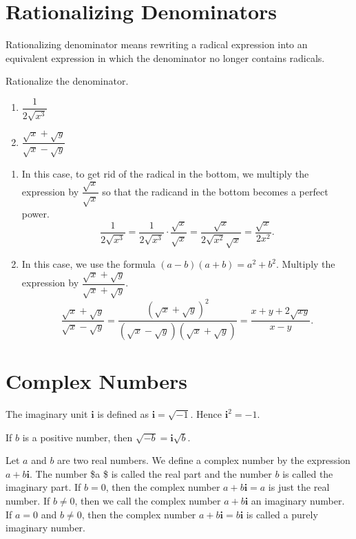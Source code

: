 \documentclass[en,12pt]{elegantbook}
\providecommand{\tightlist}{%
  \setlength{\itemsep}{0pt}\setlength{\parskip}{0pt}}
\newcommand{\ii}{\mathbf{i}}
\providecommand{\tightlist}{%
  \setlength{\itemsep}{0pt}\setlength{\parskip}{0pt}}
\let\BeginKnitrBlock\begin \let\EndKnitrBlock\end
\begin{document}
\hypertarget{rationalizing-denominators}{%
\section{Rationalizing Denominators}\label{rationalizing-denominators}}

Rationalizing denominator means rewriting a radical expression into an equivalent expression in which the denominator no longer contains radicals.

\BeginKnitrBlock{example}
\protect\hypertarget{exm:unnamed-chunk-79}{}{\label{exm:unnamed-chunk-79} }
Rationalize the denominator.

\begin{enumerate}
\def\labelenumi{\arabic{enumi}.}
\tightlist
\item
  \(\dfrac{1}{2\sqrt{x^3}}\)
\item
  \(\dfrac{\sqrt{x}+\sqrt{y}}{\sqrt{x}-\sqrt{y}}\)
\end{enumerate}
\EndKnitrBlock{example}

\BeginKnitrBlock{solution}


\begin{enumerate}
\def\labelenumi{\arabic{enumi}.}
\tightlist
\item
  In this case, to get rid of the radical in the bottom, we multiply the expression by \(\dfrac{\sqrt{x}}{\sqrt{x}}\) so that the radicand in the bottom becomes a perfect power.
  \[
   \dfrac{1}{2\sqrt{x^3}}=\dfrac{1}{2\sqrt{x^3}}\cdot\dfrac{\sqrt{x}}{\sqrt{x}}=\dfrac{\sqrt{x}}{2\sqrt{x^2}\sqrt{x}}=\dfrac{\sqrt{x}}{2x^2}.  
   \]
\item
  In this case, we use the formula \((a-b)(a+b)=a^2+b^2\). Multiply the expression by \(\dfrac{\sqrt{x}+\sqrt{y}}{\sqrt{x}+\sqrt{y}}\).
  \[
   \dfrac{\sqrt{x}+\sqrt{y}}{\sqrt{x}-\sqrt{y}}=\dfrac{(\sqrt{x}+\sqrt{y})^2}{(\sqrt{x}-\sqrt{y})(\sqrt{x}+\sqrt{y})}=\dfrac{x+y+2\sqrt{xy}}{x-y}.
   \]
\end{enumerate}
\EndKnitrBlock{solution}

\hypertarget{complex-numbers}{%
\section{Complex Numbers}\label{complex-numbers}}

The imaginary unit \(\ii\) is defined as \(\ii=\sqrt{-1}\). Hence \(\ii^2=-1\).

If \(b\) is a positive number, then \(\sqrt{-b}=\ii\sqrt{b}\).

Let \(a\) and \(b\) are two real numbers. We define a complex number by the expression \(a+b \ii\).
The number \$a \$ is called the real part and the number \(b\) is called the imaginary part. If \(b=0\),
then the complex number \(a+b\ii=a\) is just the real number.
If \(b\neq 0\), then we call the complex number \(a+b\ii\) an imaginary number.
If \(a=0\) and \(b\neq 0\), then the complex number \(a+b\ii=b\ii\) is called a purely imaginary number.
\end{document}
